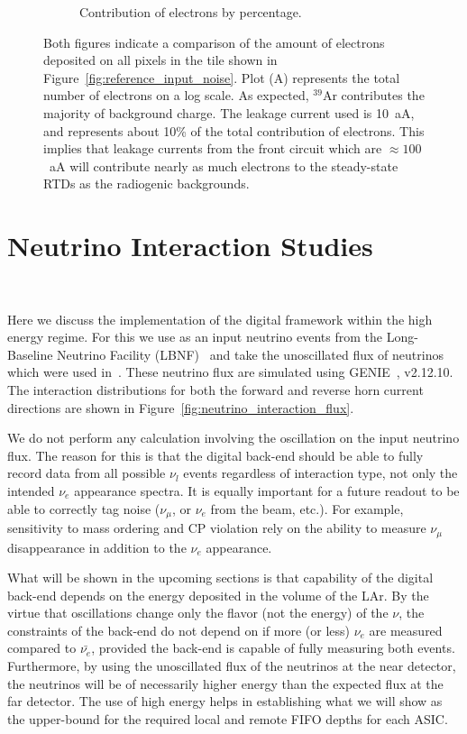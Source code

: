 \begin{figure}
\begin{subfigure}{.5\textwidth}
  \caption{Contribution of electrons by percentage.}
\end{subfigure}
\caption{Both figures indicate a comparison of the amount of electrons deposited on all pixels in the tile shown in Figure~\ref{fig:reference_input_noise}.
Plot (A) represents the total number of electrons on a log scale.
As expected, $^{39}$Ar contributes the majority of background charge.
The leakage current used is 10~\unit{aA}, and represents about 10\% of the total contribution of electrons.
This implies that leakage currents from the front circuit which are $\approx 100$~\unit{aA} will contribute nearly as much electrons to the steady-state RTDs as the radiogenic backgrounds.
}
\label{fig:compare_electron_contribution}
\end{figure}

\section{Neutrino Interaction Studies}~\label{sec:neutrino_studies}

Here we discuss the implementation of the digital framework within the high energy regime.
For this we use as an input neutrino events from the Long-Baseline Neutrino Facility (LBNF)~\citep{dune_cdr_2016_arxiv} and take the unoscillated flux of neutrinos which were used in~\citep{dune_2021_near_detector_cdr}.
These neutrino flux are simulated using GENIE~\citep{Andreopoulos:2009rq}, v2.12.10.
The interaction distributions for both the forward and reverse horn current directions are shown in Figure~\ref{fig:neutrino_interaction_flux}.

We do not perform any calculation involving the oscillation on the input neutrino flux.
The reason for this is that the digital back-end should be able to fully record data from all possible $\nu_{l}$ events regardless of interaction type, not only the intended $\nu_{e}$ appearance spectra.
It is equally important for a future readout to be able to correctly tag noise ($\nu_{\mu}$, or $\nu_{e}$ from the beam, etc.).
For example, sensitivity to mass ordering and CP violation rely on the ability to measure $\nu_{\mu}$ disappearance in addition to the $\nu_{e}$ appearance.

What will be shown in the upcoming sections is that capability of the digital back-end depends on the energy deposited in the volume of the LAr.
By the virtue that oscillations change only the flavor (not the energy) of the $\nu$, the constraints of the back-end do not depend on if more (or less) $\nu_{e}$ are measured compared to $\bar{\nu_{e}}$, provided the back-end is capable of fully measuring both events.
Furthermore, by using the unoscillated flux of the neutrinos at the near detector, the neutrinos will be of necessarily higher energy than the expected flux at the far detector.
The use of high energy helps in establishing what we will show as the upper-bound for the required local and remote FIFO depths for each ASIC.

